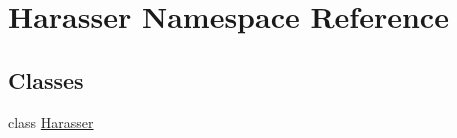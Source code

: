 \hypertarget{namespace_harasser}{\section{Harasser Namespace Reference}
\label{namespace_harasser}
}
\subsection*{Classes}
\begin{DoxyCompactItemize}
\item 
class \hyperlink{class_harasser_1_1_harasser}{Harasser}
\end{DoxyCompactItemize}
